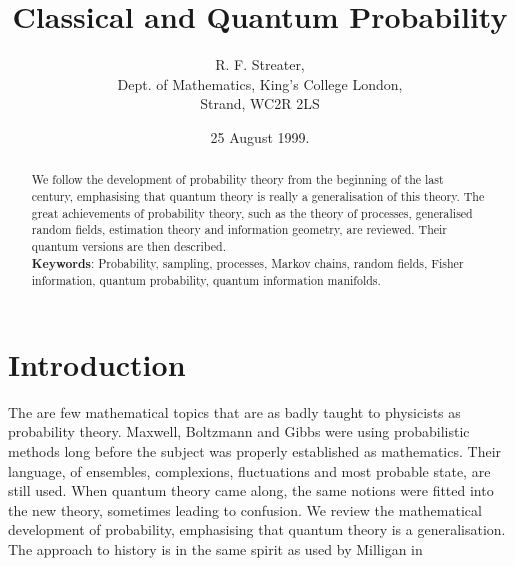 \renewcommand{\textwidth}{5.6in}
\renewcommand{\textheight}{8in}
\newtheorem{theorem}{Theorem}[section]
\newtheorem{lemma}[theorem]{Lemma}
\newtheorem{definition}[theorem]{Definition}
\title{Classical and Quantum Probability}
\author{R. F. Streater,\\Dept. of Mathematics,
King's College London,\\ Strand, WC2R 2LS}
\date{25 August 1999.}

\maketitle
\begin{abstract}
We follow the development of probability theory from the beginning
of the last century, emphasising that quantum theory is really a
generalisation of
this theory. The great achievements of probability theory, such as
the theory of processes, generalised random fields, estimation
theory and information geometry, are reviewed. Their quantum versions
are then described.\\
{\bf Keywords}: Probability, sampling, processes, Markov chains, random fields,
Fisher information, quantum probability, quantum information manifolds.
\end{abstract}
\section{Introduction}
The are few mathematical topics that are as badly taught to physicists
as probability theory. Maxwell, Boltzmann and Gibbs were using probabilistic
methods long before the subject was properly established as mathematics.
Their language, of ensembles,
complexions, fluctuations and most probable state, are still used. When
quantum theory came along, the same notions were fitted into the new theory,
sometimes leading to confusion. We review the mathematical development
of probability, emphasising that quantum theory is a generalisation. The
approach to history is in the same spirit as used by Milligan in
\cite{Milligan}

